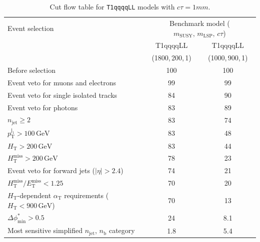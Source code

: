 \begin{table}[!h]
  \caption{Cut flow table for \texttt{T1qqqqLL} models with $c\tau = 1\unit{mm}$.} 
  \label{tab:cut_flow_ctau_1}
{\scriptsize%
\centering
\begin{tabular}{lcc}
  \hline
  Event selection & \multicolumn{2}{c}{Benchmark model ($m_\mathrm{SUSY},\,m_\mathrm{LSP},\,c\tau$)} \\
  \cline{2-3}
   & T1qqqqLL & T1qqqqLL \\
    & (1800,\,200,\,1) & (1000,\,900,\,1) \\
  \hline
  Before selection  & 100\phantom{.1} & 100\phantom{.1} \\
  Event veto for muons and electrons & \phantom{1}99\phantom{.1} & \phantom{1}99\phantom{.1} \\
  Event veto for single isolated tracks & \phantom{1}84\phantom{.1} & \phantom{1}90\phantom{.1} \\
  Event veto for photons & \phantom{1}83\phantom{.1} & \phantom{1}89\phantom{.1} \\
   $n_{\mathrm{jet}} \geq 2$  & \phantom{1}83\phantom{.1} & \phantom{1}74\phantom{.1} \\
   $p_{\mathrm{T}}^{\mathrm{j_1}} > 100\,\mathrm{GeV}$ & \phantom{1}83\phantom{.1} & \phantom{1}48\phantom{.1} \\
   $H_{\mathrm{T}} > 200\,\mathrm{GeV}$  & \phantom{1}83\phantom{.1} & \phantom{1}44\phantom{.1} \\
  $H_{\mathrm{T}}^{\mathrm{miss}} > 200\,\mathrm{GeV}$  & \phantom{1}78\phantom{.1} & \phantom{1}23\phantom{.1} \\
  Event veto for forward jets ($|\eta| > 2.4$) & \phantom{1}74\phantom{.1} & \phantom{1}21\phantom{.1} \\
  $H_{\mathrm{T}}^{\mathrm{miss}} / E_{\mathrm{T}}^{\mathrm{miss}} < 1.25$ & \phantom{1}70\phantom{.1} & \phantom{1}20\phantom{.1} \\
  $H_{\mathrm{T}}$-dependent $\alpha_{\mathrm{T}}$ requirements ($H_{\mathrm{T}} < 900\,\mathrm{GeV}$)  & \phantom{1}70\phantom{.1} & \phantom{1}13\phantom{.1} \\
  $\Delta\phi^{*}_{\mathrm{min}} > 0.5$  & \phantom{1}24\phantom{.1} & \phantom{10}8.1 \\
  \hline
  Most sensitive simplified $n_{\mathrm{jet}}$, $n_{\mathrm{b}}$ category & \phantom{10}1.8 & \phantom{10}5.4 \\
  \hline
\end{tabular}
}
\end{table}


